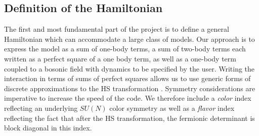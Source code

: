 \subsection{Definition of the Hamiltonian}

The first and most fundamental part of the project  is to define a general Hamiltonian which  can  accommodate a large class of models. 
Our approach is to express the model as a sum of one-body terms, a sum of two-body terms each written as a perfect square of a one body term, as well as a one-body term coupled to a bosonic field with  dynamics to be specified by the user. 
Writing the interaction in terms of sums of perfect squares allows us to use generic forms of  discrete  approximations to the  HS  transformation \cite{Motome97,Assaad97}.
Symmetry considerations  are  imperative to increase the speed of the code.  
We therefore include a \emph{color} index  reflecting  an underlying  $SU(N)$ color symmetry as  well as a \emph{flavor} index  reflecting  the fact that  after  the HS  transformation,  the  fermionic determinant is block diagonal in this index.

